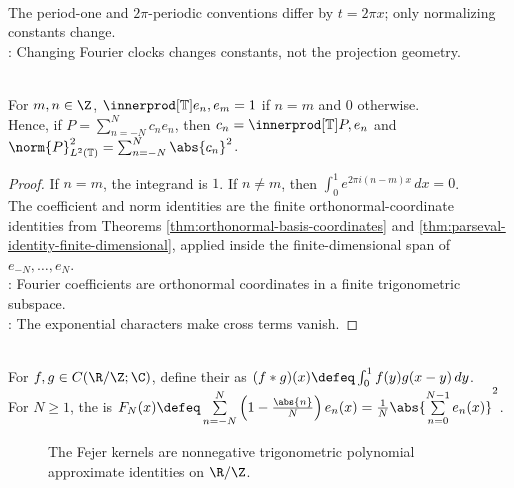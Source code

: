 \begin{perspective} \label{per:period-one-versus-two-pi-fourier} \\
The period-one and $2\pi$-periodic conventions differ by $t=2\pi x$; only normalizing constants change.\\
: Changing Fourier clocks changes constants, not the projection geometry.
\end{perspective}

\begin{proposition} \label{prop:period-one-characters-orthonormal} \\
For $m,n\in\Z$, $\innerprod[\mathbb{T}]{e_n,e_m}=1$ if $n=m$ and $0$ otherwise.\\
Hence, if $P=\sum\limits_{n=-N}^{N}c_ne_n$, then $c_n=\innerprod[\mathbb{T}]{P,e_n}$ and $\norm{P}_{L^2(\mathbb{T})}^2=\sum_{n=-N}^{N}\abs{c_n}^2$.
\begin{proof}
If $n=m$, the integrand is $1$. If $n\neq m$, then $\int_0^1e^{2\pi i(n-m)x}\,dx=0$.\\
The coefficient and norm identities are the finite orthonormal-coordinate identities from Theorems \ref{thm:orthonormal-basis-coordinates} and \ref{thm:parseval-identity-finite-dimensional}, applied inside the finite-dimensional span of $e_{-N},\ldots,e_N$.\\
: Fourier coefficients are orthonormal coordinates in a finite trigonometric subspace.\\
: The exponential characters make cross terms vanish.
\end{proof}
\end{proposition}

\begin{definition} \label{def:periodic-convolution-and-fejer-kernel} \\
For $f,g\in C(\R/\Z;\C)$, define their  as $(f*g)(x)\defeq\int_0^1 f(y)g(x-y)\,dy$.\\
For $N\geq1$, the  is $F_N(x)\defeq \sum\limits_{n=-N}^{N}\left(1-\frac{\abs{n}}{N}\right)e_n(x) =\frac{1}{N}\abs{\sum\limits_{n=0}^{N-1}e_n(x)}^2$.
\end{definition}

\begin{figure}[H]
  \centering
  
  \caption{The Fejer kernels are nonnegative trigonometric polynomial approximate identities on $\R/\Z$.}
  \label{fig:fejer-kernel-periodic-approx-identity}
\end{figure}

